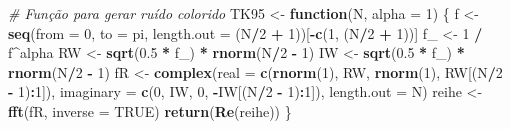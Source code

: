 \documentclass[
]{article}
\newenvironment{Shaded}{\begin{snugshade}}{\end{snugshade}}
\newcommand{\AttributeTok}[1]{\textcolor[rgb]{0.13,0.29,0.53}{#1}}
\newcommand{\CommentTok}[1]{\textcolor[rgb]{0.56,0.35,0.01}{\textit{#1}}}
\newcommand{\ConstantTok}[1]{\textcolor[rgb]{0.56,0.35,0.01}{#1}}
\newcommand{\ControlFlowTok}[1]{\textcolor[rgb]{0.13,0.29,0.53}{\textbf{#1}}}
\newcommand{\DecValTok}[1]{\textcolor[rgb]{0.00,0.00,0.81}{#1}}
\newcommand{\FloatTok}[1]{\textcolor[rgb]{0.00,0.00,0.81}{#1}}
\newcommand{\FunctionTok}[1]{\textcolor[rgb]{0.13,0.29,0.53}{\textbf{#1}}}
\newcommand{\NormalTok}[1]{#1}
\newcommand{\OtherTok}[1]{\textcolor[rgb]{0.56,0.35,0.01}{#1}}
\newcommand{\SpecialCharTok}[1]{\textcolor[rgb]{0.81,0.36,0.00}{\textbf{#1}}}
\begin{document}
\begin{Shaded}
\begin{Highlighting}[]
\CommentTok{\# Função para gerar ruído colorido}
\NormalTok{TK95 }\OtherTok{\textless{}{-}} \ControlFlowTok{function}\NormalTok{(N, }\AttributeTok{alpha =} \DecValTok{1}\NormalTok{) \{ }
\NormalTok{  f }\OtherTok{\textless{}{-}} \FunctionTok{seq}\NormalTok{(}\AttributeTok{from =} \DecValTok{0}\NormalTok{, }\AttributeTok{to =}\NormalTok{ pi, }\AttributeTok{length.out =}\NormalTok{ (N}\SpecialCharTok{/}\DecValTok{2} \SpecialCharTok{+} \DecValTok{1}\NormalTok{))[}\SpecialCharTok{{-}}\FunctionTok{c}\NormalTok{(}\DecValTok{1}\NormalTok{, (N}\SpecialCharTok{/}\DecValTok{2} \SpecialCharTok{+} \DecValTok{1}\NormalTok{))]}
\NormalTok{  f\_ }\OtherTok{\textless{}{-}} \DecValTok{1} \SpecialCharTok{/}\NormalTok{ f}\SpecialCharTok{\^{}}\NormalTok{alpha}
\NormalTok{  RW }\OtherTok{\textless{}{-}} \FunctionTok{sqrt}\NormalTok{(}\FloatTok{0.5} \SpecialCharTok{*}\NormalTok{ f\_) }\SpecialCharTok{*} \FunctionTok{rnorm}\NormalTok{(N}\SpecialCharTok{/}\DecValTok{2} \SpecialCharTok{{-}} \DecValTok{1}\NormalTok{)}
\NormalTok{  IW }\OtherTok{\textless{}{-}} \FunctionTok{sqrt}\NormalTok{(}\FloatTok{0.5} \SpecialCharTok{*}\NormalTok{ f\_) }\SpecialCharTok{*} \FunctionTok{rnorm}\NormalTok{(N}\SpecialCharTok{/}\DecValTok{2} \SpecialCharTok{{-}} \DecValTok{1}\NormalTok{)}
\NormalTok{  fR }\OtherTok{\textless{}{-}} \FunctionTok{complex}\NormalTok{(}\AttributeTok{real =} \FunctionTok{c}\NormalTok{(}\FunctionTok{rnorm}\NormalTok{(}\DecValTok{1}\NormalTok{), RW, }\FunctionTok{rnorm}\NormalTok{(}\DecValTok{1}\NormalTok{), RW[(N}\SpecialCharTok{/}\DecValTok{2} \SpecialCharTok{{-}} \DecValTok{1}\NormalTok{)}\SpecialCharTok{:}\DecValTok{1}\NormalTok{]), }
                \AttributeTok{imaginary =} \FunctionTok{c}\NormalTok{(}\DecValTok{0}\NormalTok{, IW, }\DecValTok{0}\NormalTok{, }\SpecialCharTok{{-}}\NormalTok{IW[(N}\SpecialCharTok{/}\DecValTok{2} \SpecialCharTok{{-}} \DecValTok{1}\NormalTok{)}\SpecialCharTok{:}\DecValTok{1}\NormalTok{]), }\AttributeTok{length.out =}\NormalTok{ N)}
\NormalTok{  reihe }\OtherTok{\textless{}{-}} \FunctionTok{fft}\NormalTok{(fR, }\AttributeTok{inverse =} \ConstantTok{TRUE}\NormalTok{)}
  \FunctionTok{return}\NormalTok{(}\FunctionTok{Re}\NormalTok{(reihe))}
\NormalTok{\}}


\end{Highlighting}
\end{Shaded}
\end{document}

